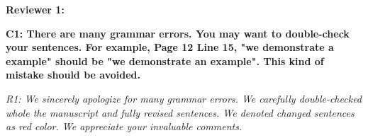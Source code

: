 \documentclass[onecolumn]{IEEEconf}
\begin{document}
\textbf{\large Reviewer 1:}\\
\begin{description}
    \item \textbf
	{
	C1: There are many grammar errors. You may want to double-check your sentences. For example,  Page 12 Line 15, "we demonstrate a example" should be "we demonstrate an example". This kind of mistake should be avoided. 
	}
	\item \textit
	{
	R1: We sincerely apologize for many grammar errors. We carefully double-checked whole the manuscript and fully revised sentences. We denoted changed sentences as red color. We appreciate your invaluable comments.
	}
	~\\
    ~\\
\end{description}
\end{document}
